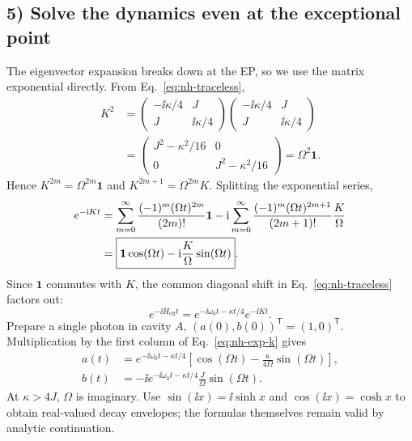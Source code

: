 \subsection*{5) Solve the dynamics even at the exceptional point}
The eigenvector expansion breaks down at the EP, so we use
the matrix exponential directly. From Eq.~\eqref{eq:nh-traceless},
\begin{equation}
\begin{aligned}
K^2&=\begin{pmatrix}-\ii\kappa/4&J\\J&\ii\kappa/4\end{pmatrix}
     \begin{pmatrix}-\ii\kappa/4&J\\J&\ii\kappa/4\end{pmatrix}\\
&=\begin{pmatrix}J^2-\kappa^2/16&0\\0&J^2-\kappa^2/16\end{pmatrix}
=\Omega^2 \mathbf1.
\end{aligned}
\end{equation}
Hence $K^{2m}=\Omega^{2m}\mathbf1$ and
$K^{2m+1}=\Omega^{2m}K$. Splitting the exponential series,
\begin{align}
e^{-\mathrm{i} Kt}
&=\sum_{m=0}^\infty\frac{(-1)^m(\Omega t)^{2m}}{(2m)!}\mathbf1
 -\mathrm{i}\sum_{m=0}^\infty
     \frac{(-1)^m(\Omega t)^{2m+1}}{(2m+1)!}
     \frac{K}{\Omega}\notag\\
&=\boxed{\mathbf1\cos(\Omega t)-\mathrm{i}\frac{K}{\Omega}\sin(\Omega t)}.
\label{eq:nh-exp-k}
\end{align}
Since $\mathbf1$ commutes with $K$, the common diagonal shift
in Eq.~\eqref{eq:nh-traceless} factors out:
\begin{equation}
e^{-\ii H_{\mathrm{eff}}t}
=e^{-\ii\omega_0t-\kappa t/4}e^{-\ii Kt}.
\end{equation}
Prepare a single photon in cavity $A$,
$(a(0),b(0))^{\mathsf T}=(1,0)^{\mathsf T}$.
Multiplication by the first column of
Eq.~\eqref{eq:nh-exp-k} gives
\begin{align}
a(t)&=e^{-\ii\omega_0t-\kappa t/4}
 \left[\cos(\Omega t)-\frac{\kappa}{4\Omega}\sin(\Omega t)\right],
\label{eq:nh-amplitude-a}\\
b(t)&=-\ii e^{-\ii\omega_0t-\kappa t/4}
 \frac{J}{\Omega}\sin(\Omega t).
\label{eq:nh-amplitude-b}
\end{align}
At $\kappa>4J$, $\Omega$ is imaginary.
Use $\sin(\ii x)=\ii\sinh x$ and
$\cos(\ii x)=\cosh x$ to obtain real-valued
decay envelopes; the formulas themselves remain valid
by analytic continuation.

